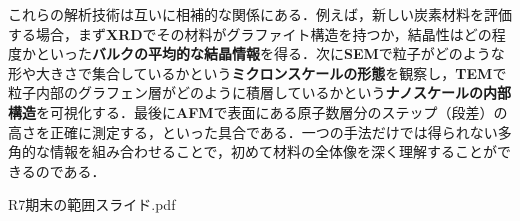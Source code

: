 \documentclass[11pt,a4paper]{ltjsarticle}
\begin{document}
これらの解析技術は互いに相補的な関係にある．例えば，新しい炭素材料を評価する場合，まず\textbf{XRD}でその材料がグラファイト構造を持つか，結晶性はどの程度かといった\textbf{バルクの平均的な結晶情報}を得る．次に\textbf{SEM}で粒子がどのような形や大きさで集合しているかという\textbf{ミクロンスケールの形態}を観察し，\textbf{TEM}で粒子内部のグラフェン層がどのように積層しているかという\textbf{ナノスケールの内部構造}を可視化する．最後に\textbf{AFM}で表面にある原子数層分のステップ（段差）の高さを正確に測定する，といった具合である．一つの手法だけでは得られない多角的な情報を組み合わせることで，初めて材料の全体像を深く理解することができるのである．

\begin{thebibliography}{9}
 R7期末の範囲スライド.pdf
\end{thebibliography}
\end{document}
